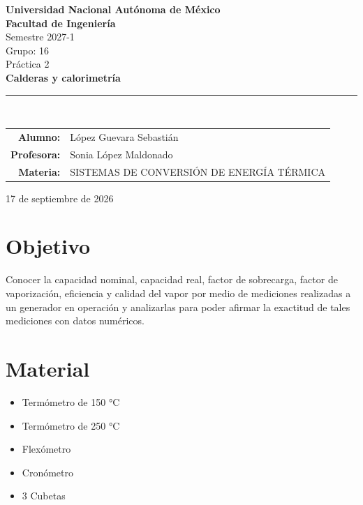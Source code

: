 \documentclass[12pt,letterpaper]{article}
\newcommand{\institucion}{Universidad Nacional Autónoma de México}
\newcommand{\facultad}{Facultad de Ingeniería}
\newcommand{\numpractica}{Práctica 2}
\newcommand{\semestre}{Semestre 2027-1}
\newcommand{\entrega}{17 de septiembre de 2026}
\newcommand{\grupo}{Grupo: 16}
\newcommand{\alumno}{López Guevara Sebastián}
\newcommand{\profesora}{Sonia López Maldonado}
\newcommand{\practica}{Calderas y calorimetría}
\newcommand{\materia}{SISTEMAS DE CONVERSIÓN DE ENERGÍA TÉRMICA}
\begin{document}
\thispagestyle{empty}

\begin{center}

    {\Large\bfseries \institucion}\\[0.3cm]
    {\Large\bfseries \facultad}\\[0.3cm]
    {\large \semestre}\\[0.2cm]
    {\large \grupo}\\[1.5cm]
    
    
    {\large \numpractica}\\[0.2cm]
    {\Huge\bfseries \practica}\\[0.5cm]
    \rule{0.8\textwidth}{0.4pt}\\[1.5cm]

    \begin{tabular}{rl}
        \textbf{Alumno:}     & \alumno     \\[0.3cm]
        \textbf{Profesora:}  & \profesora  \\[0.3cm]
        \textbf{Materia:}    & \materia    \\
    \end{tabular}

    \vfill
    
    {\entrega}
    
\end{center}

\break

\section{Objetivo}
Conocer la capacidad nominal, capacidad real, factor de sobrecarga, factor de vaporización,
eficiencia y calidad del vapor
por medio de mediciones realizadas a un generador en operación y analizarlas para
poder afirmar la exactitud de tales mediciones con datos numéricos.

\section{Material}
\begin{itemize}
    \item Termómetro de 150 °C
    \item Termómetro de 250 °C
    \item Flexómetro
    \item Cronómetro
    \item 3 Cubetas
\end{itemize}
\end{document}
